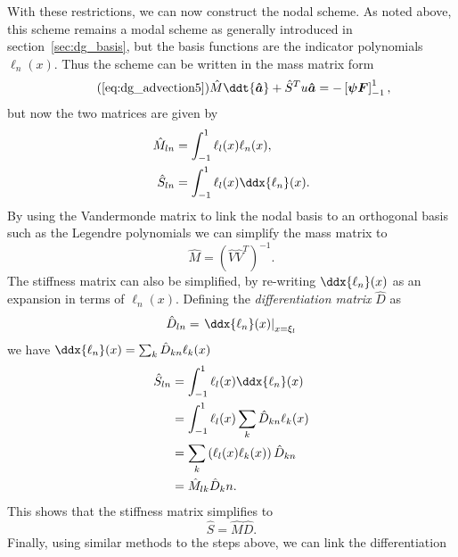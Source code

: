 With these restrictions, we can now construct the nodal scheme. As noted above,
this scheme remains a modal scheme as generally introduced in section~\ref{sec:dg_basis},
but the basis functions are the indicator polynomials $\ell_n(x)$. Thus the
scheme can be written in the mass matrix form
%
\begin{equation}
  \tag{\ref{eq:dg_advection5}}
  \hat{M} \ddt{\bm{\hat{a}}} + \hat{S}^T u \bm{\hat{a}} = -\left[ \bm{\psi F} \right]_{-1}^1,
\end{equation}
%
but now the two matrices are given by
%
\begin{align}
  \label{eq:dg_nodal_mass_matrix}
  \hat{M}_{ln} &= \int_{-1}^1 \ell_l(x) \ell_n(x), \\
  \label{eq:dg_nodal_stiffness_matrix}
  \hat{S}_{ln} &= \int_{-1}^1 \ell_l(x) \ddx{\ell_n}(x).
\end{align}
%
By using the Vandermonde matrix to link the nodal basis to an orthogonal basis
such as the Legendre polynomials we can simplify the mass matrix to
%
\begin{equation}
  \label{eq:dg_nodal_mass_matrix_from_V}
  \hat{M} = \left( \hat{V} \hat{V}^T \right)^{-1}.
\end{equation}
%
The stiffness matrix can also be simplified, by re-writing $\ddx{\ell_n}(x)$ as
an expansion in terms of $\ell_n(x)$. Defining the \emph{differentiation matrix}
$\hat{D}$ as
%
\begin{equation}
  \label{eq:dg_nodal_differentiation}
  \hat{D}_{ln} = \left. \ddx{\ell_n}(x) \right|_{x = \xi_l}
\end{equation}
%
we have $\ddx{\ell_n}(x) = \sum_k \hat{D}_{kn} \ell_k(x)$
%
\begin{subequations}
  \label{eq:dg_nodal_stiffness_matrix_from_D_steps}
  \begin{align}
    \hat{S}_{ln} &= \int_{-1}^1 \ell_l(x) \ddx{\ell_n}(x) \\
    &= \int_{-1}^1 \ell_l(x) \sum_k \hat{D}_{kn} \ell_k(x) \\
    &= \sum_k \left( \ell_l(x) \ell_k(x) \right) \hat{D}_{kn} \\
    &= \hat{M}_{lk} \hat{D}_kn.
  \end{align}
\end{subequations}
%
This shows that the stiffness matrix simplifies to
%
\begin{equation}
  \label{eq:dg_nodal_stiffness_matrix_from_V}
  \hat{S} = \hat{M} \hat{D}.
\end{equation}
%
Finally, using similar methods to the steps above, we can link the differentiation

